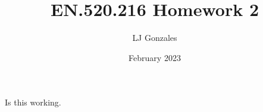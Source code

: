 \documentclass{article}
\title{EN.520.216 Homework 2}
\author{LJ Gonzales}
\date{February 2023}
\theoremstyle{mystyle}
\begin{document}
\maketitle

Is this working.
\end{document}
